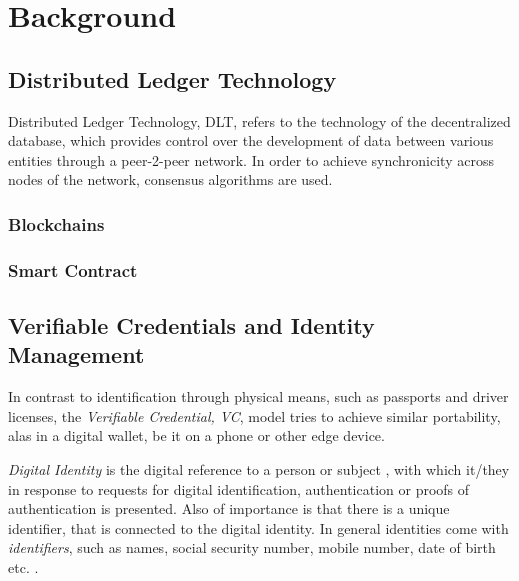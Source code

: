 \chapter{Background}
\label{chap:Background}


\section{Distributed Ledger Technology} %
\label{sec:Distributed Ledger Technology}

Distributed Ledger Technology, DLT, refers to the technology of the decentralized database, which provides control over
the development of data between various entities through a peer-2-peer network. In order to achieve synchronicity across
nodes of the network, consensus algorithms are used.


\subsection{Blockchains} %
\label{sub:Blockchains}


\subsection{Smart Contract} %
\label{sec:Smart Contract}


\section{Verifiable Credentials and Identity Management} %
\label{sec:Verifiable Credentials and Identity Management}
In contrast to identification through physical means, such as passports and driver licenses, the
\textit{Verifiable Credential, VC}, model tries to achieve similar portability, alas in a digital wallet, be it on a
phone or other edge device. \cite{world2019verifiablecredentials}

\textit{Digital Identity} is the digital reference to a person or subject \cite{Domingo_2020}, with which it/they in
response to requests for digital identification, authentication or proofs of authentication is presented. Also of
importance is that there is a unique identifier, that is connected to the digital identity.
\cite{Sedlmeir_Smethurst_Rieger_Fridgen_2021}
In general identities come with \textit{identifiers}, such as names, social security number, mobile number, date of
birth etc. \cite{eth-decentralized-identity}.

